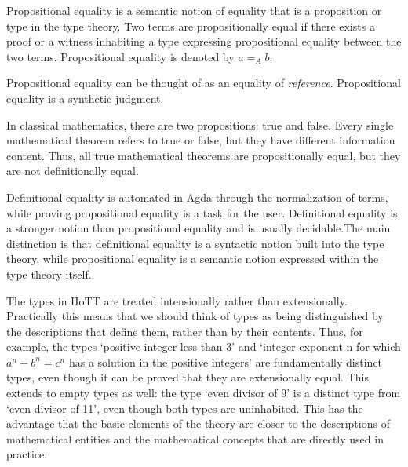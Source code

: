 \documentclass{article}
\begin{document}
\begin{definition}\label{dfn: propositional equality}
  Propositional equality is a semantic notion of equality that is a proposition or type in the type theory. Two terms are propositionally equal if there exists a proof or a witness inhabiting a type expressing propositional equality between the two terms. Propositional equality is denoted by $a =_{A} b$.
\end{definition}

\begin{remark}[?]
  Propositional equality can be thought of as an equality of \emph{reference}. Propositional equality is a synthetic judgment.
\end{remark}

\begin{example}[?]
 In classical mathematics, there are two propositions: true and false. Every single mathematical theorem refers to true or false, but they have different information content. Thus, all true mathematical theorems are propositionally equal, but they are not definitionally equal.
\end{example}

\begin{remark}
  Definitional equality is automated in Agda through the normalization of terms, while proving propositional equality is a task for the user. Definitional equality is a stronger notion than propositional equality and is usually decidable.The main distinction is that definitional equality is a syntactic notion built into the type theory, while propositional equality is a semantic notion expressed within the type theory itself.
\end{remark}

\begin{remark}
  The types in HoTT are treated intensionally rather than extensionally. Practically this means that we should think of types as being distinguished by the descriptions that define them, rather than by their contents. Thus, for example, the types ‘positive integer less than 3’ and ‘integer exponent n for which $a^n + b^n = c^n$ has a solution in the positive integers’ are fundamentally distinct types, even though it can be proved that they are extensionally equal. This extends to empty types as well: the type ‘even divisor of 9’ is a distinct type from ‘even divisor of 11’, even though both types are uninhabited. This has the advantage that the basic elements of the theory are closer to the descriptions of mathematical entities and the mathematical concepts that are directly used in practice.
\end{remark}
\end{document}
